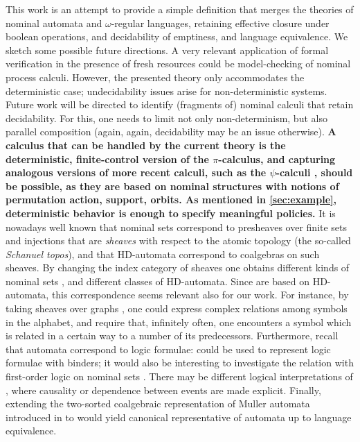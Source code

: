 This work is an attempt to provide a simple definition that merges the theories of nominal automata and $\omega$-regular languages, retaining effective closure under boolean operations, and decidability of emptiness, and language equivalence. We sketch some possible future directions. A very relevant application of formal verification in the presence of fresh resources could be model-checking of nominal process calculi. However, the presented theory only accommodates the deterministic case; undecidability issues arise for non-deterministic systems. Future work will be directed to identify (fragments of) nominal calculi that retain decidability. For this, one needs to limit not only non-determinism, but also parallel composition (again, again, decidability may be an issue otherwise). {\bf A calculus that can be handled by the current theory is the deterministic, finite-control version of the $\pi$-calculus, and capturing analogous versions of more recent calculi, such as the $\psi$-calculi \cite{Bengtson11}, should be possible, as they are based on nominal structures with notions of permutation action, support, orbits. As mentioned in \autoref{sec:example}, deterministic behavior is enough to specify meaningful policies.} It is nowadays well known that nominal sets correspond to presheaves over finite sets and injections that are \emph{sheaves} with respect to the atomic topology (the so-called \emph{Schanuel topos}), and that HD-automata correspond to coalgebras on such sheaves. By changing the index category of sheaves one obtains different kinds of nominal sets \cite{CianciaKM10}, and different classes of HD-automata. Since \hdmas{} are based on HD-automata, this correspondence seems relevant also for our work. For instance, by taking sheaves over graphs \cite{SammartinoPhD}, one could express complex relations among symbols in the alphabet, and require that, infinitely often, one encounters a symbol which is related in a certain way to a number of its predecessors. Furthermore, recall that automata correspond to logic formulae: \hdmas{} could be used to represent logic formulae with binders; it would also be interesting to investigate the relation with first-order logic on nominal sets \cite{Bojanczyk13}. There may be different logical interpretations of \hdmas, where causality or dependence \cite{Vnnen07,Galliani12} between events are made explicit. Finally, extending the two-sorted coalgebraic representation of Muller automata introduced in \cite{CV12} to \hdmas{} would yield canonical representative of automata up to language equivalence.



